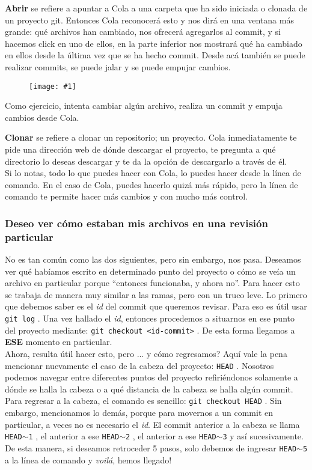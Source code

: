 \documentclass[10pt,letterpaper]{article}
\newcommand{\inlinecode}[1]{
\colorbox{light-gray}{\texttt{#1}}
}
\newcommand{\Picture}[1]
{
	\begin{figure}[H]
	\begin{flushleft}
	\texttt{[image: \#1]}
	\end{flushleft}
	\end{figure}
}
\begin{document}
\textbf{Abrir} se refiere a apuntar a Cola a una carpeta que ha sido iniciada o clonada de un proyecto git. Entonces Cola reconocer\'a esto y nos dir\'a en una ventana m\'as grande: qu\'e archivos han cambiado, nos ofrecer\'a agregarlos al commit, y si hacemos click en uno de ellos, en la parte inferior nos mostrar\'a qu\'e ha cambiado en ellos desde la \'ultima vez que se ha hecho commit. Desde ac\'a tambi\'en se puede realizar commits, se puede jalar y se puede empujar cambios.

\Picture{img/cola2.png}

Como ejercicio, intenta cambiar alg\'un archivo, realiza un commit y empuja cambios desde Cola.

\textbf{Clonar} se refiere a clonar un repositorio; un proyecto. Cola inmediatamente te pide una direcci\'on web de d\'onde descargar el proyecto, te pregunta a qu\'e directorio lo deseas descargar y te da la opci\'on de descargarlo a trav\'es de \'el.\\

Si lo notas, todo lo que puedes hacer con Cola, lo puedes hacer desde la l\'inea de comando. En el caso de Cola, puedes hacerlo quiz\'a m\'as r\'apido, pero la l\'inea de comando te permite hacer m\'as cambios y con mucho m\'as control.

\subsubsection{Deseo ver c\'omo estaban mis archivos en una revisi\'on particular}
No es tan com\'un como las dos siguientes, pero sin embargo, nos pasa. Deseamos ver qu\'e hab\'iamos escrito en determinado punto del proyecto o c\'omo se ve\'ia un archivo en particular porque ``entonces funcionaba, y ahora no''. Para hacer esto se trabaja de manera muy similar a las ramas, pero con un truco leve. Lo primero que debemos saber es el \emph{id} del commit que queremos revisar. Para eso es \'util usar \inlinecode{git log}. Una vez hallado el \emph{id}, entonces procedemos a situarnos en ese punto del proyecto mediante: \inlinecode{git checkout <id-commit>}. De esta forma llegamos a \textbf{ESE} momento en particular.\\

Ahora, resulta \'util hacer esto, pero ... y c\'omo regresamos? Aqu\'i vale la pena mencionar nuevamente el caso de la cabeza del proyecto: \inlinecode{HEAD}. Nosotros podemos navegar entre diferentes puntos del proyecto refiri\'endonos solamente a d\'onde se halla la cabeza o a qu\'e distancia de la cabeza se halla alg\'un commit. Para regresar a la cabeza, el comando es sencillo: \inlinecode{git checkout HEAD}. Sin embargo, mencionamos lo dem\'as, porque para movernos a un commit en particular, a veces no es necesario el \emph{id}. El commit anterior a la cabeza se llama \inlinecode{HEAD$\sim$1}, el anterior a ese \inlinecode{HEAD$\sim$2}, el anterior a ese \inlinecode{HEAD$\sim$3} y as\'i sucesivamente. De esta manera, si deseamos retroceder 5 pasos, solo debemos de ingresar \inlinecode{HEAD$\sim$5} a la l\'inea de comando y \emph{voil\'a}, hemos llegado!
\end{document}

